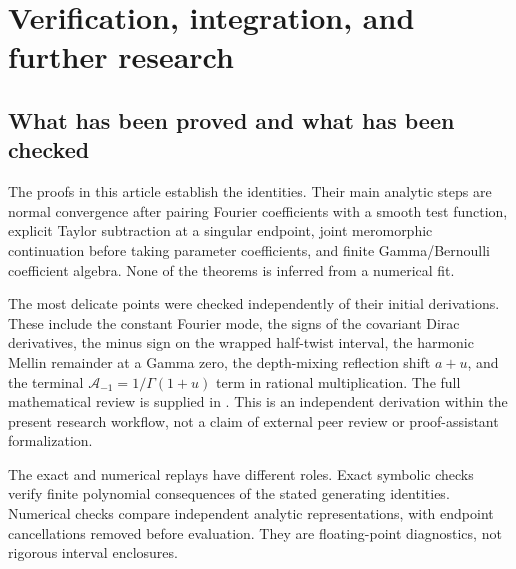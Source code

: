 \section{Verification, integration, and further research}
\label{future:sec}

\subsection{What has been proved and what has been checked}

The proofs in this article establish the identities. Their main
analytic steps are normal convergence after pairing Fourier
coefficients with a smooth test function, explicit Taylor subtraction
at a singular endpoint, joint meromorphic continuation before taking
parameter coefficients, and finite Gamma/Bernoulli coefficient
algebra. None of the theorems is inferred from a numerical fit.

The most delicate points were checked independently of their initial
derivations. These include the constant Fourier mode, the signs of
the covariant Dirac derivatives, the minus sign on the wrapped
half-twist interval, the harmonic Mellin remainder at a Gamma zero,
the depth-mixing reflection shift \(a+u\), and the terminal
\(\mathcal A_{-1}=1/\Gamma(1+u)\) term in rational multiplication.
The full mathematical review is supplied in
. This is an independent
derivation within the present research workflow, not a claim of
external peer review or proof-assistant formalization.

The exact and numerical replays have different roles.
Exact symbolic checks verify finite polynomial consequences of the
stated generating identities. Numerical checks compare independent
analytic representations, with endpoint cancellations removed before
evaluation. They are floating-point diagnostics, not rigorous
interval enclosures.

